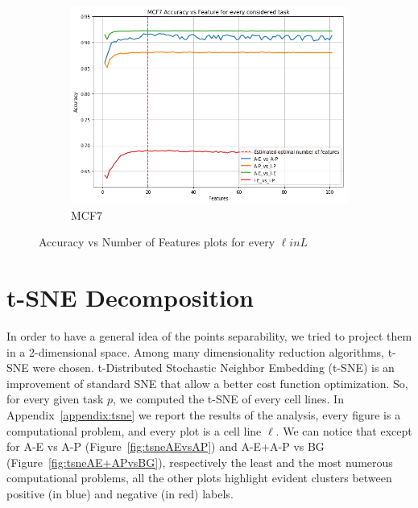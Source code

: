 \begin{figure}[!htb]
    \begin{subfigure}[b]{0.48\textwidth}
        \includegraphics[width=\textwidth]{images/features_plots_accuracy/MCF7_n_features.png}
        \caption{MCF7}
        \label{fig:MCF7_n_feat}
    \end{subfigure}
    \caption{Accuracy vs Number of Features plots for every $\ell in L$}\label{fig:feats_plot_accuracy}
\end{figure}

\section{t-SNE Decomposition}
In order to have a general idea of the points separability, we tried to  project them in a 2-dimensional space. Among many dimensionality reduction algorithms, t-SNE were chosen. t-Distributed Stochastic Neighbor Embedding (t-SNE) \cite{vanDerMaaten2008} is an improvement of standard SNE \cite{HintonSNE} that allow a better cost function optimization. So, for every given task $p$, we  computed the t-SNE of every cell lines. 
In Appendix~\ref{appendix:tsne} we report the results of the analysis, every figure is a computational problem, and every plot is a cell line $\ell$. We can notice that except for A-E vs A-P (Figure~\ref{fig:tsneAEvsAP}) and A-E+A-P vs BG (Figure~\ref{fig:tsneAE+APvsBG}), respectively the least and the most numerous computational problems, all the other plots highlight evident clusters between positive (in blue) and negative (in red) labels. 